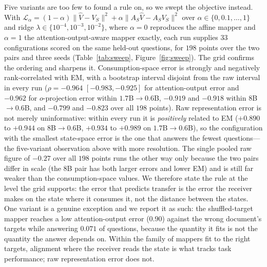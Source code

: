 \documentclass[11pt]{article}
\begin{document}
Five variants are too few to found a rule on, so we swept the objective instead.
With $\mathcal{L}_\alpha = (1-\alpha)\|\hat V - V_S\|^2 +
\alpha\|A_S\hat V - A_S V_S\|^2$ over $\alpha \in \{0, 0.1, \dots, 1\}$ and ridge
$\lambda \in \{10^{-4}, 10^{-3}, 10^{-2}\}$, where $\alpha=0$ reproduces the
affine mapper and $\alpha=1$ the attention-output-aware mapper exactly, each run
supplies $33$ configurations scored on the same held-out questions, for $198$
points over the two pairs and three seeds (Table~\ref{tab:sweep},
Figure~\ref{fig:sweep}). The grid confirms the ordering and sharpens
it. Consumption-space error is strongly and negatively rank-correlated with EM,
with a bootstrap interval disjoint from the raw interval in every run
($\rho=-0.964$ $[-0.983,-0.925]$ for attention-output error and $-0.962$ for
$o$-projection error within $1.7$B$\to0.6$B, $-0.919$ and $-0.918$ within
$8$B$\to0.6$B, and $-0.799$ and $-0.823$ over all $198$ points). Raw
representation error is not merely uninformative: within every run it is
\emph{positively} related to EM ($+0.890$ to $+0.944$ on $8$B$\to0.6$B, $+0.934$
to $+0.989$ on $1.7$B$\to0.6$B), so the configuration with the smallest
state-space error is the one that answers the fewest questions---the
five-variant observation above with more resolution. The single pooled raw figure
of $-0.27$ over all $198$ points runs the other way only because the two pairs
differ in scale (the $8$B pair has both larger errors and lower EM) and is still
far weaker than the consumption-space values. We therefore state the rule at the
level the grid supports: the error that predicts transfer is the error the
receiver makes on the state where it consumes it, not the distance between the
states. One variant
is a genuine exception and we report it as
such: the shuffled-target mapper reaches a low attention-output error ($0.90$)
against the wrong document's targets while answering $0.071$ of questions,
because the quantity it fits is not the quantity the answer depends on. Within
the family of mappers fit to the right targets, alignment where the receiver reads
the state is what tracks task performance; raw representation error does not.
\end{document}
